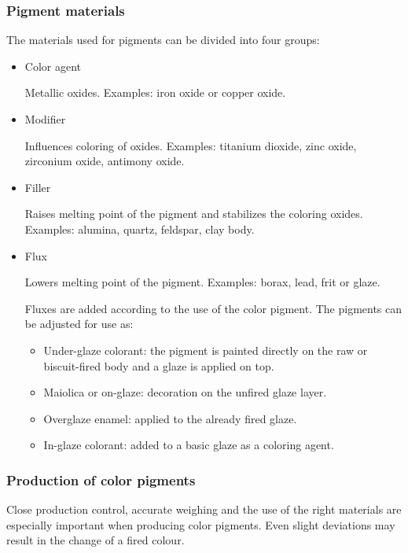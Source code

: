 \subsubsection{Pigment materials}
The materials used for pigments can be divided into four groups:
\begin{itemize}
\item Color agent

Metallic oxides. Examples: iron oxide or copper oxide.

\item Modifier

Influences coloring of oxides. Examples: titanium dioxide, zinc 
oxide, zirconium oxide, antimony oxide.

\item Filler

Raises melting point of the pigment and stabilizes the coloring oxides. 
Examples: alumina, quartz, feldspar, clay body.

\item Flux

Lowers melting point of the pigment. Examples: borax, lead, frit or 
glaze.

Fluxes are added according to the use of the color pigment. The pigments can be 
adjusted for use as:
\begin{itemize}
\item Under-glaze colorant: the pigment is painted directly on the raw or 
biscuit-fired body and a glaze is applied on top.
\item Maiolica or on-glaze: decoration on the unfired glaze layer.
\item Overglaze enamel: applied to the already fired glaze.
\item In-glaze colorant: added to a basic glaze as a coloring agent.
\end{itemize}
\end{itemize}
\subsubsection{Production of color pigments}
Close production control, accurate weighing and the use of the right materials 
are especially important when producing color pigments. Even slight deviations 
may result in the change of a fired colour.

